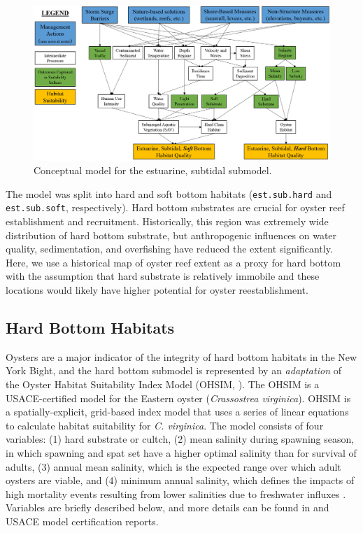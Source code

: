 \documentclass[
]{book}
\begin{document}
\begin{figure}
\includegraphics[width=23.04in]{ZZ_Fig04.06_Est.Sub_ConModel} \caption{Conceptual model for the estuarine, subtidal submodel.}\label{fig:unnamed-chunk-14}
\end{figure}

The model was split into hard and soft bottom habitats (\texttt{est.sub.hard} and \texttt{est.sub.soft}, respectively). Hard bottom substrates are crucial for oyster reef establishment and recruitment. Historically, this region was extremely wide distribution of hard bottom substrate, but anthropogenic influences on water quality, sedimentation, and overfishing have reduced the extent significantly. Here, we use a historical map of oyster reef extent as a proxy for hard bottom with the assumption that hard substrate is relatively immobile and these locations would likely have higher potential for oyster reestablishment.

\hypertarget{hard-bottom-habitats}{%
\subsection{Hard Bottom Habitats}\label{hard-bottom-habitats}}

Oysters are a major indicator of the integrity of hard bottom habitats in the New York Bight, and the hard bottom submodel is represented by an \emph{adaptation} of the Oyster Habitat Suitability Index Model (OHSIM, \citet{swannack_robust_2014}). The OHSIM is a USACE-certified model for the Eastern oyster (\emph{Crassostrea virginica}). OHSIM is a spatially-explicit, grid-based index model that uses a series of linear equations to calculate habitat suitability for \emph{C. virginica}. The model consists of four variables: (1) hard substrate or cultch, (2) mean salinity during spawning season, in which spawning and spat set have a higher optimal salinity than for survival of adults, (3) annual mean salinity, which is the expected range over which adult oysters are viable, and (4) minimum annual salinity, which defines the impacts of high mortality events resulting from lower salinities due to freshwater influxes \citep{soniat_understanding_2012}. Variables are briefly described below, and more details can be found in \citet{swannack_robust_2014} and USACE model certification reports.
\end{document}
